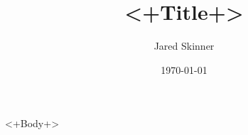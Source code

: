 \documentclass{amsart}
\theoremstyle{definition}
\theoremstyle{remark}
\numberwithin{equation}{section}
\theoremstyle{plain}
\begin{document}
\title{<+Title+>}
\author{Jared Skinner}
\date{\today}
\maketitle

<+Body+>
\end{document}

